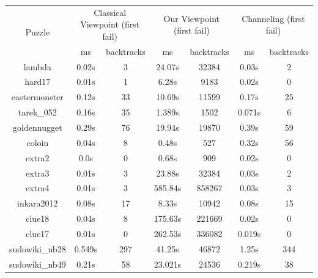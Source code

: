 \documentclass{report}
\begin{document}
\begin{table}[h!]
  \begin{tabular}{|c|c|c|c|c|c|c|}
    \hline
    \multirow{2}{*}{Puzzle} &
      \multicolumn{2}{L|}{Classical Viewpoint (first fail)} &
      \multicolumn{2}{L|}{Our Viewpoint (first fail)} &
      \multicolumn{2}{L|}{ Channeling (first fail)} \\
    & ms & backtracks & ms & backtracks & ms & backtracks \\
    \hline
lambda & 0.02s & 3 & 24.07s & 32384 & 0.03s & 2\\
hard17 & 0.01s & 1 & 6.28s & 9183 & 0.02s & 0\\
eastermonster & 0.12s & 33 & 10.69s & 11599 & 0.17s & 25\\
tarek\_052 & 0.16s & 35 & 1.389s & 1502 & 0.071s & 6\\
goldennugget & 0.29s & 76 & 19.94s & 19870 & 0.39s & 59\\
coloin & 0.04s & 8 & 0.48s & 527 & 0.32s & 56\\
extra2 & 0.0s & 0 & 0.68s & 909 & 0.02s & 0\\
extra3 & 0.01s & 3 & 23.88s & 32384 & 0.03s & 2\\
extra4 & 0.01s & 3 & 585.84s & 858267 & 0.03s & 3\\
inkara2012 & 0.08s & 17 & 8.33s & 10942 & 0.08s & 15\\
clue18 & 0.04s & 8 & 175.63s & 221669 & 0.02s & 0\\
clue17 & 0.01s & 0 & 262.53s & 336082 & 0.019s & 0\\
sudowiki\_nb28 & 0.549s & 297 & 41.25s & 46872 & 1.25s & 344\\
sudowiki\_nb49 & 0.21s & 58 & 23.021s & 24536 & 0.219s & 38\\
 \hline
  \end{tabular}
\end{table}
\end{document}
